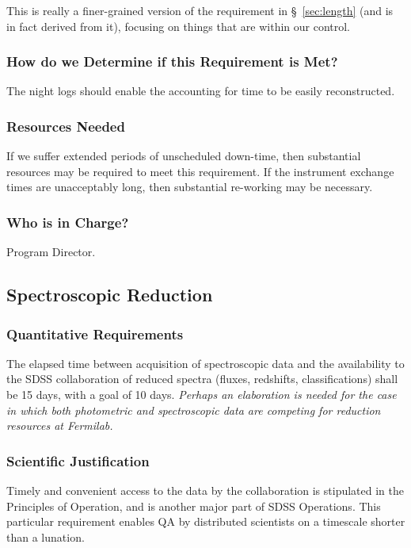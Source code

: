 This is really a finer-grained version of the requirement in
\S~\ref{sec:length} (and is in fact derived from it), focusing on things that 
are within our control.

\subsubsection{How do we Determine if this Requirement is Met?} 

The night logs should enable the accounting for time to be easily 
reconstructed.

\subsubsection{Resources Needed} 

If we suffer extended periods of unscheduled down-time, then substantial 
resources may be required to meet this requirement.  If the instrument 
exchange times are unacceptably long, then substantial re-working may be 
necessary. 

\subsubsection{Who is in Charge?}

Program Director. 

\subsection{Spectroscopic Reduction}

\subsubsection{Quantitative Requirements}

The elapsed time between acquisition of spectroscopic data and the 
availability to the SDSS collaboration of reduced spectra (fluxes, redshifts, 
classifications) shall be 15 days, with a goal of 10 days.  {\it
Perhaps an elaboration is needed for the case in which both
photometric and spectroscopic data are competing for reduction
resources at Fermilab.}

\subsubsection{Scientific Justification}

Timely and convenient access to the data by the collaboration is
stipulated in the Principles of Operation, and is another major part
of SDSS Operations.  This particular requirement enables QA by
distributed scientists on a timescale shorter than a lunation.

